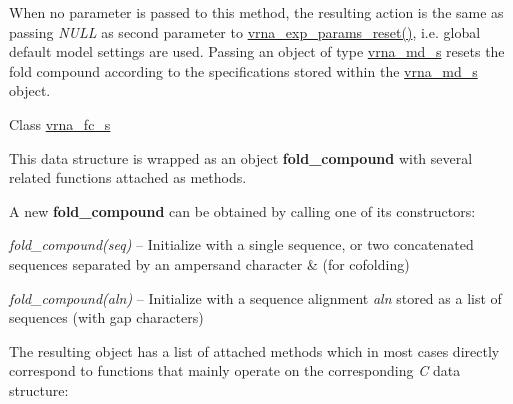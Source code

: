 \begin{DoxyRefList}
When no parameter is passed to this method, the resulting action is the same as passing {\itshape N\+U\+LL} as second parameter to \mbox{\hyperlink{group__energy__parameters_gaa5409218068be84d7b50c78fbdaa85a9}{vrna\+\_\+exp\+\_\+params\+\_\+reset()}}, i.\+e. global default model settings are used. Passing an object of type \mbox{\hyperlink{group__model__details_structvrna__md__s}{vrna\+\_\+md\+\_\+s}} resets the fold compound according to the specifications stored within the \mbox{\hyperlink{group__model__details_structvrna__md__s}{vrna\+\_\+md\+\_\+s}} object.  
\item[Class \mbox{\hyperlink{group__fold__compound}{vrna\+\_\+fc\+\_\+s}} ]\label{wrappers__wrappers000081}%
%
 

This data structure is wrapped as an object {\bfseries{fold\+\_\+compound}} with several related functions attached as methods.

A new {\bfseries{fold\+\_\+compound}} can be obtained by calling one of its constructors\+:~\newline

\begin{DoxyItemize}
\item {\itshape fold\+\_\+compound(seq)} -- Initialize with a single sequence, or two concatenated sequences separated by an ampersand character \textquotesingle{}\&\textquotesingle{} (for cofolding)
\item {\itshape fold\+\_\+compound(aln)} -- Initialize with a sequence alignment {\itshape aln} stored as a list of sequences (with gap characters)
\end{DoxyItemize}The resulting object has a list of attached methods which in most cases directly correspond to functions that mainly operate on the corresponding {\itshape C} data structure\+:~\newline


\end{DoxyRefList}
